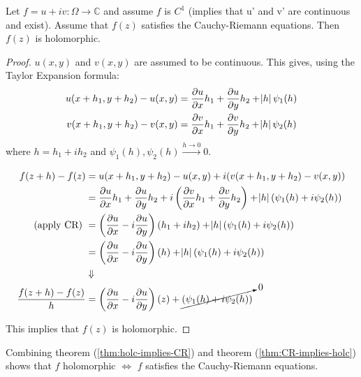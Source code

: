 \begin{theorem}\label{thm:CR-implies-holc}
Let $f=u+iv:\Omega \xrightarrow{} \mathbb{C}$ and assume $f$ is $C^1$ (implies that u' and v' are continuous and exist). Assume that $f(z)$ satisfies the Cauchy-Riemann equations. Then $f(z)$ is holomorphic.
\end{theorem}

\begin{proof}
$u(x,y)$ and $v(x,y)$ are assumed to be continuous. This gives, using the Taylor Expansion formula:
\begin{align*}
    u(x+h_1,y+h_2) - u(x,y) &= \frac{\partial u}{\partial x}h_1 + \frac{\partial u}{\partial y}h_2 +\abs{h}\psi_1(h)\\
    v(x+h_1,y+h_2) - v(x,y) &= \frac{\partial v}{\partial x}h_1 + \frac{\partial v}{\partial y}h_2 +\abs{h}\psi_2(h)
\end{align*}
where $h=h_1+ih_2$ and $\psi_1(h),\psi_2(h) \xrightarrow[]{h \to 0} 0$.

\begin{align*}
    f(z+h)-f(z) &= u(x+h_1,y+h_2) - u(x,y) +i(v(x+h_1,y+h_2) - v(x,y))\\
    &= \frac{\partial u}{\partial x}h_1 + \frac{\partial u}{\partial y}h_2 + i\left(\frac{\partial v}{\partial x}h_1 + \frac{\partial v}{\partial y}h_2\right) + \abs{h}(\psi_1(h)+i\psi_2(h))\\
    \text{(apply CR) } &= \left( \frac{\partial u}{\partial x} -i\frac{\partial u}{\partial y}\right)(h_1+ih_2)+\abs{h}(\psi_1(h)+i\psi_2(h))\\&= \left( \frac{\partial u}{\partial x} -i\frac{\partial u}{\partial y}\right)(h)+\abs{h}(\psi_1(h)+i\psi_2(h))\\
    &\Downarrow\\
    \frac{f(z+h)-f(z)}{h}& = \left(\frac{\partial u}{\partial x} -i\frac{\partial u}{\partial y}  \right)(z) + \cancelto{0}{(\psi_1(h)+i\psi_2(h))}
\end{align*}

This implies that $f(z)$ is holomorphic.
\end{proof}

\begin{remark}
Combining theorem (\ref{thm:holc-implies-CR}) and theorem (\ref{thm:CR-implies-holc}) shows that $f$ holomorphic $\iff$ $f$ satisfies the Cauchy-Riemann equations.
\end{remark}


